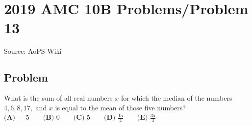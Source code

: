 \documentclass[12pt]{article}
\begin{document}
\section*{{2019 AMC 10B Problems/Problem 13}}
Source: AoPS Wiki

\subsection*{Problem}
What is the sum of all real numbers $x$ for which the median of the numbers $4,6,8,17,$ and $x$ is equal to the mean of those five numbers? $\textbf{(A) } -5 \qquad\textbf{(B) } 0 \qquad\textbf{(C) } 5 \qquad\textbf{(D) } \frac{15}{4} \qquad\textbf{(E) } \frac{35}{4}$
\end{document}
